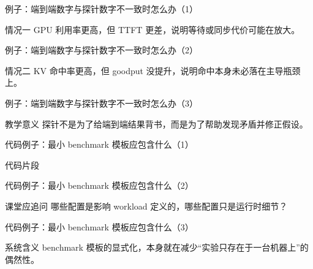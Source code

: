 \begin{frame}{例子：端到端数字与探针数字不一致时怎么办（1）}
\begin{block}{情况一}
    GPU 利用率更高，但 TTFT 更差，说明等待或同步代价可能在放大。
  \end{block}
\end{frame}

\begin{frame}{例子：端到端数字与探针数字不一致时怎么办（2）}
\begin{block}{情况二}
    KV 命中率更高，但 goodput 没提升，说明命中本身未必落在主导瓶颈上。
  \end{block}
\end{frame}

\begin{frame}{例子：端到端数字与探针数字不一致时怎么办（3）}
\begin{block}{教学意义}
    探针不是为了给端到端结果背书，而是为了帮助发现矛盾并修正假设。
  \end{block}
\end{frame}

\begin{frame}{代码例子：最小 benchmark 模板应包含什么（1）}
\begin{block}{代码片段}
    {\ttfamily\small
    \par
    \par
    \par
    \par
    }
  \end{block}
\end{frame}

\begin{frame}{代码例子：最小 benchmark 模板应包含什么（2）}
\begin{block}{课堂应追问}
    哪些配置是影响 workload 定义的，哪些配置只是运行时细节？
  \end{block}
\end{frame}

\begin{frame}{代码例子：最小 benchmark 模板应包含什么（3）}
\begin{block}{系统含义}
    benchmark 模板的显式化，本身就在减少“实验只存在于一台机器上”的偶然性。
  \end{block}
\end{frame}


